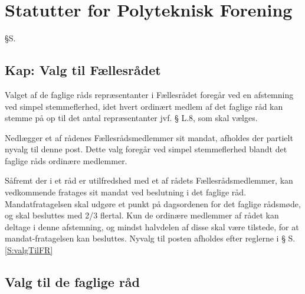 \setcounter{section}{19}
\setcounter{subsection}{0}
\section*{Statutter for Polyteknisk Forening}


\begin{list}
{\S S.}{}

\subsection{Kap: Valg til Fællesrådet}
\label{kap:valgtilfaellesraad}

\item \label{S:valgTilFR} Valget af de faglige råds repræsentanter i Fællesrådet foregår ved en afstemning ved simpel stemmeflerhed, idet hvert ordinært medlem af det faglige råd kan stemme på op til det antal repræsentanter jvf. § L.8, som skal vælges.

\item \label{S:nyValgTilFR} Nedlægger et af rådenes Fællesrådsmedlemmer sit mandat, afholdes der partielt nyvalg til denne post. Dette valg foregår ved simpel stemmeflerhed blandt det faglige råds ordinære medlemmer.

\item \label{S:fratagsValgTilFR} Såfremt der i et råd er utilfredshed med et af rådets Fællesrådsmedlemmer, kan vedkommende fratages sit mandat ved beslutning i det faglige råd. Mandatfratagelsen skal udgøre et punkt på dagsordenen for det faglige rådsmøde, og skal besluttes med 2/3 flertal. Kun de ordinære medlemmer af rådet kan deltage i denne afstemning, og mindst halvdelen af disse skal være tilstede, for at mandat-fratagelsen kan besluttes. Nyvalg til posten afholdes efter reglerne i § S.\ref{S:valgTilFR}



\subsection{Valg til de faglige råd}


\end{list}
